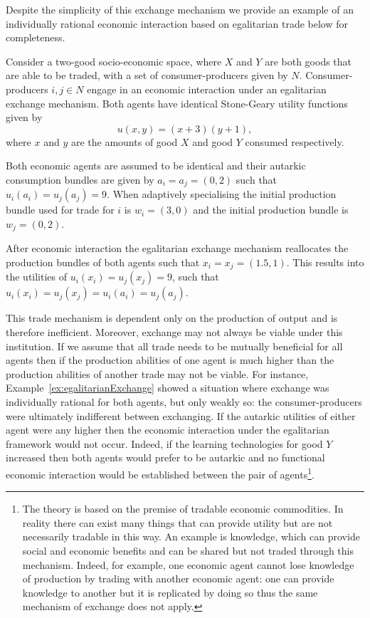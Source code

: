 Despite the simplicity of this exchange mechanism we provide an example of an individually rational economic interaction based on egalitarian trade below for completeness.
\begin{example} \label{ex:egalitarianExchange}
Consider a two-good socio-economic space, where $X$ and $Y$ are both goods that are able to be traded, with a set of consumer-producers given by $N$. Consumer-producers $i,j \in N$ engage in an economic interaction under an egalitarian exchange mechanism. Both agents have identical Stone-Geary utility functions given by
\begin{equation}
u(x,y) = (x + 3) (y + 1) ,
\end{equation}
where $x$ and $y$ are the amounts of good $X$ and good $Y$ consumed respectively.

Both economic agents are assumed to be identical and their autarkic consumption bundles are given by $a_{i} = a_{j} = (0, 2)$ such that $u_{i}(a_{i}) = u_{j}(a_{j}) = 9$. When adaptively specialising the initial production bundle used for trade for $i$ is $w_{i} = (3, 0)$ and the initial production bundle is $w_{j} = (0, 2)$.

After economic interaction the egalitarian exchange mechanism reallocates the production bundles of both agents such that $x_{i} = x_{j} = (1.5, 1)$. This results into the utilities of $u_{i}(x_{i}) = u_{j}(x_{j}) = 9$, such that $u_{i}(x_{i}) = u_{j}(x_{j}) = u_{i}(a_{i}) = u_{j}(a_{j})$.
\end{example}

This trade mechanism is dependent only on the production of output and is therefore inefficient. Moreover, exchange may not always be viable under this institution. If we assume that all trade needs to be mutually beneficial for all agents then if the production abilities of one agent is much higher than the production abilities of another trade may not be viable. For instance, Example~\ref{ex:egalitarianExchange} showed a situation where exchange was individually rational for both agents, but only weakly so: the consumer-producers were ultimately indifferent between exchanging. If the autarkic utilities of either agent were any higher then the economic interaction under the egalitarian framework would not occur. Indeed, if the learning technologies for good $Y$ increased then both agents would prefer to be autarkic and no functional economic interaction would be established between the pair of agents\footnote{The theory is based on the premise of tradable economic commodities. In reality there can exist many things that can provide utility but are not necessarily tradable in this way. An example is knowledge, which can provide social and economic benefits and can be shared but not traded through this mechanism. Indeed, for example, one economic agent cannot lose knowledge of production by trading with another economic agent: one can provide knowledge to another but it is replicated by doing so thus the same mechanism of exchange does not apply.}.

